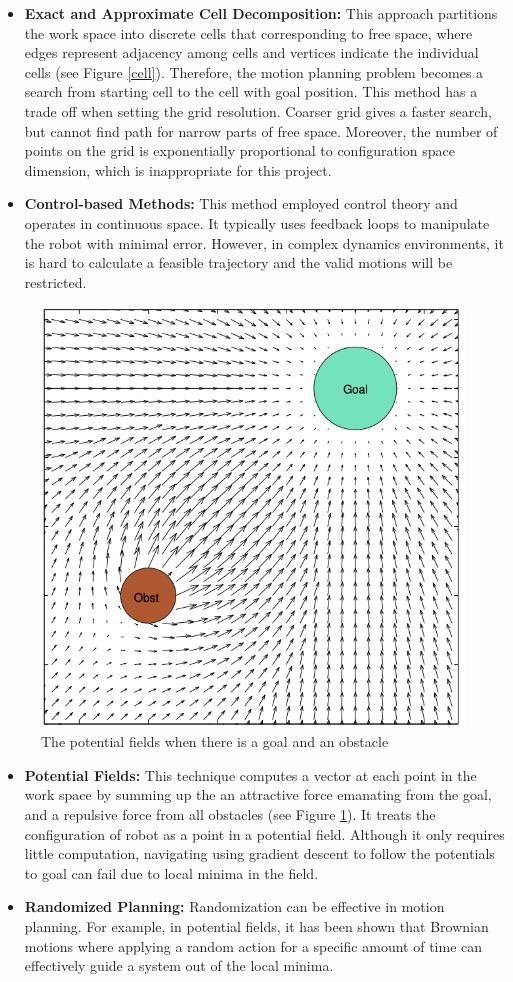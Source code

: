 \begin{itemize}
    \item \textbf{Exact and Approximate Cell Decomposition:} This approach partitions the work space into discrete cells that corresponding to free space, where edges represent adjacency among cells and vertices indicate the individual cells (see Figure \ref{cell}). Therefore, the motion planning problem becomes a search from starting cell to the cell with goal position. This method has a trade off when setting the grid resolution. Coarser grid gives a faster search, but cannot find path for narrow parts of free space. Moreover, the number of points on the grid is exponentially proportional to configuration space dimension, which is inappropriate for this project.

    \item \textbf{Control-based Methods:} This method employed control theory and operates in continuous space. It typically uses feedback loops to manipulate the robot with minimal error. However, in complex dynamics environments, it is hard to calculate a feasible trajectory and the valid motions will be restricted.
\end{itemize}

\begin{figure}[H]
\centering
\includegraphics[width = 0.4\columnwidth]{background/potentialfield.png}
\caption{The potential fields when there is a goal and an obstacle \citep{potential}}
\label{potentialexample}
\end{figure}

\begin{itemize}
    \item \textbf{Potential Fields:} This technique computes a vector at each point in the work space by summing up the an attractive force emanating from the goal, and a repulsive force from all obstacles (see Figure \ref{potentialexample}). It treats the configuration of robot as a point in a potential field. Although it only requires little computation, navigating using gradient descent to follow the potentials to goal can fail due to local minima in the field.
    
    \item \textbf{Randomized Planning:} Randomization can be effective in motion planning. For example, in potential fields, it has been shown that Brownian motions where applying a random action for a specific amount of time can effectively guide a system out of the local minima.
\end{itemize}

